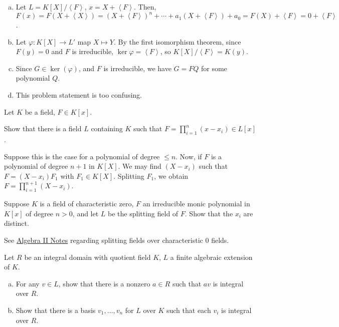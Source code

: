 \documentclass[10pt]{mypackage}
\begin{document}
\begin{solution}\hfill
  \begin{enumerate}[(a)]
    \item Let $L = K\left[ X \right]/\left\langle F \right\rangle$, $x = X + \left\langle F \right\rangle$. Then, $F(x) = F\left( X + \left\langle X \right\rangle \right) = \left( X + \left\langle F \right\rangle \right)^{n} + \cdots + a_1\left( X + \left\langle F \right\rangle \right) + a_0 = F(X) + \left\langle F \right\rangle = 0 + \left\langle F \right\rangle$.
    \item Let $\varphi\colon K\left[ X \right]\rightarrow L'$ map $X\mapsto Y$. By the first isomorphism theorem, since $F(y) = 0$ and $F$ is irreducible, $\ker\varphi = \left\langle F \right\rangle$, so $K\left[ X \right]/\left\langle F \right\rangle = K\left( y \right)$.
    \item Since $G\in \ker\left( \varphi \right)$, and $F$ is irreducible, we have $G = FQ$ for some polynomial $Q$.
    \item This problem statement is too confusing.
  \end{enumerate}
\end{solution}
\begin{exercise}[Exercise 1.52]
  Let $K$ be a field, $F\in K\left[ x \right]$.\newline

  Show that there is a field $L$ containing $K$ such that $F = \prod_{i=1}^{n}\left( x-x_i \right)\in L\left[ x \right]$.
\end{exercise}
\begin{solution}
  Suppose this is the case for a polynomial of degree $\leq n$. Now, if $F$ is a polynomial of degree $n + 1$ in $K\left[ X \right]$. We may find $\left( X-x_i \right)$ such that $F = \left( X-x_i \right)F_1$ with $F_1\in K\left[ X \right]$. Splitting $F_1$, we obtain $F=  \prod_{i=1}^{n+1}\left( X-x_i \right)$.
\end{solution}
\begin{exercise}[Exercise 1.53]
  Suppose $K$ is a field of characteristic zero, $F$ an irreducible monic polynomial in $K\left[ x \right]$ of degree $n > 0$, and let $L$ be the splitting field of $F$. Show that the $x_i$ are distinct.
\end{exercise}
\begin{solution}
  See \href{https://ai.avinash-iyer.com/Classes_and_Homework/College/Y3/Y3S2,%20Real%20II/real_2_notes.pdf}{Algebra II Notes} regarding splitting fields over characteristic $0$ fields.
\end{solution}
\begin{exercise}[Exercise 1.54]
  Let $R$ be an integral domain with quotient field $K$, $L$ a finite algebraic extension of $K$.
  \begin{enumerate}[(a)]
    \item For any $v\in L$, show that there is a nonzero $a\in R$ such that $av$ is integral over $R$.
    \item Show that there is a basis $v_1,\dots,v_n$ for $L$ over $K$ such that each $v_i$ is integral over $R$.
  \end{enumerate}
\end{exercise}
\end{document}
